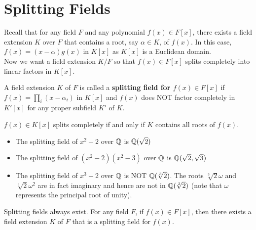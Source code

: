 \documentclass{memoir}
\begin{document}
\section{Splitting Fields}
\label{sec:splitting_fields}

Recall that for any field \(F\) and any polynomial \(f(x) \in F[x]\), there exists a field extension \(K\) over \(F\) that contains a root, say \(\alpha  \in K\), of \(f(x)\). In this case, \(f(x) = (x-\alpha )g(x)\) in \(K[x]\) as \(K[x]\) is a Euclidean domain.\\

Now we want a field extension \(K / F\) so that \(f(x) \in F[x]\) splits completely into linear factors in \(K[x]\).

\begin{defn}
	A field extension \(K\) of \(F\) is called a \textbf{splitting field for \(f(x) \in F[x]\)} if \(f(x) = \prod_{i} (x - \alpha_i) \) in \(K[x]\) and \(f(x)\) does NOT factor completely in \(K'[x]\) for any proper subfield \(K'\) of \(K\).
\end{defn}
\(f(x) \in K[x]\) splits completely if and only if \(K\) contains all roots of \(f(x)\).

\begin{exmp}
	\begin{itemize}
		\item The splitting field of \(x^2-2\) over \(\mathbb{Q}\) is \(\mathbb{Q}(\sqrt{2} )\) 
		\item The splitting field of \((x^2-2)(x^2-3)\) over \(\mathbb{Q}\) is \(\mathbb{Q}(\sqrt{2} ,\sqrt{3} )\)
		\item The splitting field of \(x^3-2\) over \(\mathbb{Q}\) is NOT \(\mathbb{Q}(\sqrt[3]{2})\). The roots \(\sqrt[3]{2}\omega \) and \(\sqrt[3]{2}\omega^2 \) are in fact imaginary and hence are not in \(\mathbb{Q}(\sqrt[3]{2})\) (note that \(\omega \) represents the principal root of unity).
	\end{itemize}
\end{exmp}

\begin{thm}
	Splitting fields always exist. For any field \(F\), if \(f(x) \in F[x]\), then there exists a field extension \(K\) of \(F\) that is a splitting field for \(f(x)\).
\end{thm}
\end{document}
